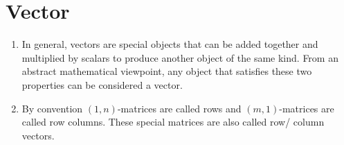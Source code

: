 \chapter{Vector}

\begin{enumerate}[itemsep=0.2cm]
    \item In general, vectors are special objects that can be added together and multiplied by scalars to produce another object of the same kind. From an abstract mathematical viewpoint, any object that satisfies these two properties can be considered a vector. 
    \hfill \cite{mfml/book/mml/Deisenroth-Faisal-Ong}

    \item By convention $(1, n)$-matrices are called rows and $(m, 1)$-matrices are called row columns. These special matrices are also called row/ column vectors.
    \hfill \cite{mfml/book/mml/Deisenroth-Faisal-Ong}

    
\end{enumerate}











